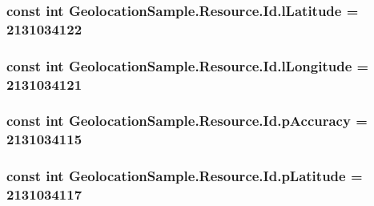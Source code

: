 \hypertarget{class_geolocation_sample_1_1_resource_1_1_id_acfc1712bda04f8ff90da627f9fb222f4}{
\subsubsection[{l\+Latitude}]{\setlength{\rightskip}{0pt plus 5cm}const int Geolocation\+Sample.\+Resource.\+Id.\+l\+Latitude = 2131034122}}\label{class_geolocation_sample_1_1_resource_1_1_id_acfc1712bda04f8ff90da627f9fb222f4}
\hypertarget{class_geolocation_sample_1_1_resource_1_1_id_ad449cd59afcc159d26b057975539f328}{
\subsubsection[{l\+Longitude}]{\setlength{\rightskip}{0pt plus 5cm}const int Geolocation\+Sample.\+Resource.\+Id.\+l\+Longitude = 2131034121}}\label{class_geolocation_sample_1_1_resource_1_1_id_ad449cd59afcc159d26b057975539f328}
\hypertarget{class_geolocation_sample_1_1_resource_1_1_id_a1aca12cfc3ed1f8db138bf005f7198e8}{
\subsubsection[{p\+Accuracy}]{\setlength{\rightskip}{0pt plus 5cm}const int Geolocation\+Sample.\+Resource.\+Id.\+p\+Accuracy = 2131034115}}\label{class_geolocation_sample_1_1_resource_1_1_id_a1aca12cfc3ed1f8db138bf005f7198e8}
\hypertarget{class_geolocation_sample_1_1_resource_1_1_id_a66b68d4271f6b2761fbf7b261a0b8f4c}{
\subsubsection[{p\+Latitude}]{\setlength{\rightskip}{0pt plus 5cm}const int Geolocation\+Sample.\+Resource.\+Id.\+p\+Latitude = 2131034117}}\label{class_geolocation_sample_1_1_resource_1_1_id_a66b68d4271f6b2761fbf7b261a0b8f4c}
